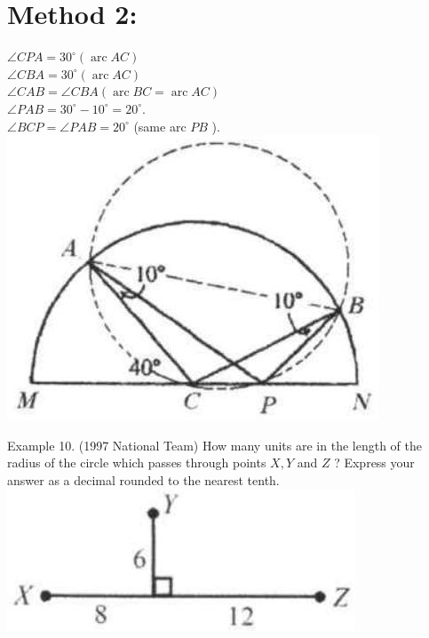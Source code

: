 \documentclass[10pt]{article}
\begin{document}
\section*{Method 2:}
\(\angle C P A=30^{\circ}(\operatorname{arc} A C)\)\\
\(\angle C B A=30^{\circ}(\operatorname{arc} A C)\)\\
\(\angle C A B=\angle C B A(\operatorname{arc} B C=\operatorname{arc} A C)\)\\
\(\angle P A B=30^{\circ}-10^{\circ}=20^{\circ}\).\\
\(\angle B C P=\angle P A B=20^{\circ}\) (same arc \(P B\) ).\\
\includegraphics[max width=\textwidth, center]{2025_04_17_97bc1f7e44d93c271a88g-204(1)}

Example 10. (1997 National Team) How many units are in the length of the radius of the circle which passes through points \(X, Y\) and \(Z\) ? Express your answer as a decimal rounded to the nearest tenth.\\
\includegraphics[max width=\textwidth, center]{2025_04_17_97bc1f7e44d93c271a88g-204}
\end{document}
